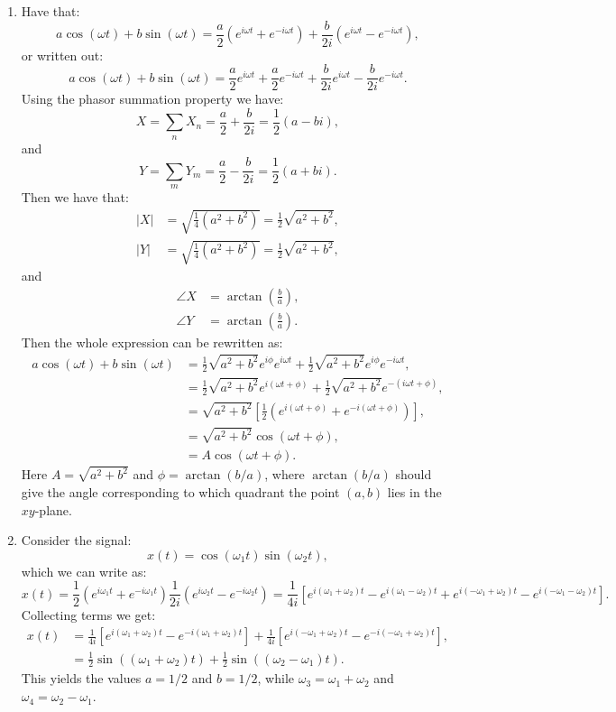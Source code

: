 \begin{enumerate}
\item Have that:
$$a\cos(\omega t)+b\sin(\omega t)=\frac{a}{2}(e^{i\omega t}+e^{-i\omega t})+\frac{b}{2i}(e^{i\omega t}-e^{-i\omega t}),$$
or written out:
$$a\cos(\omega t)+b\sin(\omega t)=\frac{a}{2}e^{i\omega t}+\frac{a}{2}e^{-i\omega t}+\frac{b}{2i}e^{i\omega t}-\frac{b}{2i}e^{-i\omega t}.$$
Using the phasor summation property we have:
$$X=\sum_{n}X_{n}=\frac{a}{2}+\frac{b}{2i}=\frac{1}{2}(a-bi),$$
and
$$Y=\sum_{m}Y_{m}=\frac{a}{2}-\frac{b}{2i}=\frac{1}{2}(a+bi).$$
Then we have that:
\begin{align*}
    |X|&=\sqrt{\frac{1}{4}(a^{2}+b^{2})}=\frac{1}{2}\sqrt{a^{2}+b^{2}}, \\
    |Y|&=\sqrt{\frac{1}{4}(a^{2}+b^{2})}=\frac{1}{2}\sqrt{a^{2}+b^{2}},
\end{align*}
and
\begin{align*}
    \angle X&=\arctan\left(\frac{b}{a}\right), \\
    \angle Y&=\arctan\left(\frac{b}{a}\right).
\end{align*}
Then the whole expression can be rewritten as:
\begin{align*}
    a\cos(\omega t)+b\sin(\omega t)&=\frac{1}{2}\sqrt{a^{2}+b^{2}}e^{i\phi}e^{i\omega t}+\frac{1}{2}\sqrt{a^{2}+b^{2}}e^{i\phi}e^{-i\omega t}, \\
    &=\frac{1}{2}\sqrt{a^{2}+b^{2}}e^{i(\omega t+\phi)}+\frac{1}{2}\sqrt{a^{2}+b^{2}}e^{-(i\omega t+\phi)}, \\
    &=\sqrt{a^{2}+b^{2}}\left[\frac{1}{2}\left(e^{i(\omega t+\phi)}+e^{-i(\omega t+\phi)}\right)\right], \\
    &=\sqrt{a^{2}+b^{2}}\cos(\omega t+\phi), \\
    &=A\cos(\omega t+\phi).
\end{align*}
Here $A=\sqrt{a^{2}+b^{2}}$ and $\phi=\arctan(b/a)$, where $\arctan(b/a)$ 
should give the angle corresponding to which quadrant the point $(a,b)$ lies in the $xy$-plane. 

\item Consider the signal:
$$x(t)=\cos(\omega_{1}t)\sin(\omega_{2}t),$$
which we can write as:
$$x(t)=\frac{1}{2}(e^{i\omega_{1}t}+e^{-i\omega_{1} t})\frac{1}{2i}(e^{i\omega_{2}t}-e^{-i\omega_{2}t})=\frac{1}{4i}[e^{i(\omega_{1}+\omega_{2})t}-e^{i(\omega_{1}-\omega_{2})t}+e^{i(-\omega_{1}+\omega_{2})t}-e^{i(-\omega_{1}-\omega_{2})t}].$$
Collecting terms we get:
\begin{align*}
    x(t)&=\frac{1}{4i}[e^{i(\omega_{1}+\omega_{2})t}-e^{-i(\omega_{1}+\omega_{2})t}]+\frac{1}{4i}[e^{i(-\omega_{1}+\omega_{2})t}-e^{-i(-\omega_{1}+\omega_{2})t}], \\
    &=\frac{1}{2}\sin((\omega_{1}+\omega_{2})t)+\frac{1}{2}\sin((\omega_{2}-\omega_{1})t).
\end{align*}
This yields the values $a=1/2$ and $b=1/2$, while $\omega_{3}=\omega_{1}+\omega_{2}$ and $\omega_{4}=\omega_{2}-\omega_{1}$. 


\end{enumerate}
